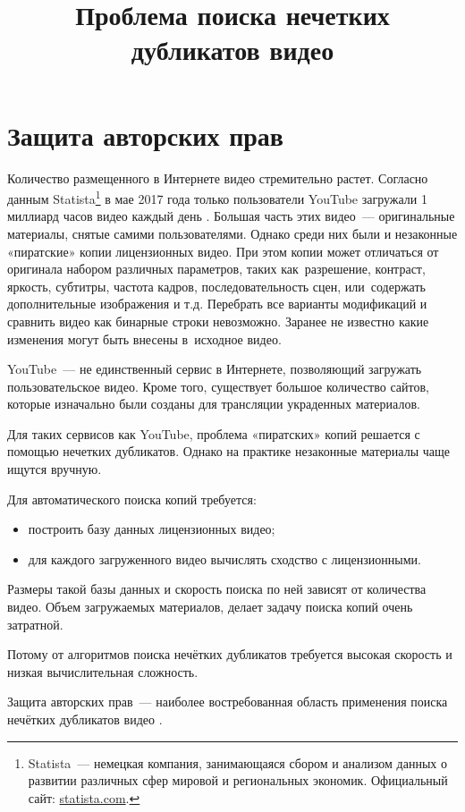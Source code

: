 \documentclass{.local/lib/classes/ndvr-super-article-standalone}
\title[NDVR thesis-abstract]{%
    Проблема поиска нечетких дубликатов видео%
}
\begin{document}
    \section{Защита авторских прав}

    Количество размещенного в Интернете видео стремительно растет.
    Согласно данным Statista\footnote{
        Statista~— немецкая компания, занимающаяся
        сбором и анализом данных о развитии различных сфер мировой
        и региональных экономик. Официальный сайт: 
            \href{https://www.statista.com/}{statista.com}.
    } в мае 2017 года только пользователи YouTube загружали 
    1 миллиард часов видео каждый день \cite{Statista:2017}.
    Большая часть этих видео~— оригинальные материалы,
    снятые самими пользователями.
    Однако среди них были и незаконные «пиратские» копии лицензионных видео.
    При этом копии может отличаться от оригинала
    набором различных параметров, таких 
    как~разрешение, контраст, яркость, субтитры,
    частота кадров, последовательность сцен, или~содержать
    дополнительные изображения и т.д.
    Перебрать все варианты модификаций 
    и сравнить видео как бинарные строки невозможно.
    Заранее не известно какие изменения могут быть 
    внесены в~исходное видео.

    YouTube~— не единственный сервис в Интернете, 
    позволяющий загружать пользовательское видео.
    Кроме того, существует большое количество сайтов,
    которые изначально были созданы 
    для трансляции украденных материалов.

    Для таких сервисов как YouTube,
    проблема «пиратских» копий решается 
    с помощью нечетких дубликатов.
    Однако на практике незаконные 
    материалы чаще ищутся вручную.

    Для автоматического поиска копий требуется:
    \begin{itemize}
        \item   построить базу данных лицензионных видео;
        \item   для каждого загруженного видео вычислять 
                сходство с лицензионными.
    \end{itemize}
    Размеры такой базы данных и скорость 
    поиска по ней зависят от количества видео.
    Объем загружаемых материалов,
    делает задачу поиска копий очень затратной. 

    Потому от алгоритмов поиска нечётких дубликатов
    требуется высокая скорость и низкая вычислительная сложность. 

    Защита авторских прав~— наиболее востребованная 
    область применения поиска нечётких дубликатов видео
    \cite{Assent:2009, Cherubini:2009, Shen:2007, Law-To:2007}.
\end{document}
